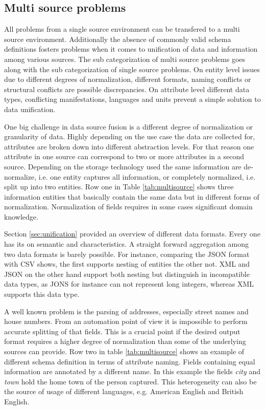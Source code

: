 \subsection{Multi source problems}
All problems from a single source environment can be transfered to a multi source environment. Additionally the absence of commonly valid schema definitions fosters problems when it comes to unification of data and information among various sources. The sub categorization of multi source problems goes along with the sub categorization of single source problems. On entity level issues due to different degrees of normalization, different formats, naming conflicts or structural conflicts are possible discrepancies. On attribute level different data types, conflicting manifestations, languages and units prevent a simple solution to data unification.

One big challenge in data source fusion is a different degree of normalization or granularity of data. Highly depending on the use case the data are collected for, attributes are broken down into different abstraction levels. For that reason one attribute in one source can correspond to two or more attributes in a second source. Depending on the storage technology used the same information are de-normalize, i.e. one entity captures all information, or completely normalized, i.e. split up into two entities. Row one in Table \ref{tab:multisource} shows three information entities that basically contain the same data but in different forms of normalization. Normalization of fields requires in some cases significant domain knowledge. 

Section \ref{sec:unification} provided an overview of different data formats. Every one has its on semantic and characteristics. A straight forward aggregation among two data formats is barely possible. For instance, comparing the JSON format with CSV shows, the first supports nesting of entities the other not. XML and JSON on the other hand support both nesting but distinguish in incompatible data types, as JONS for instance can not represent long integers, whereas XML supports this data type.

A well known problem is the parsing of addresses, especially street names and house numbers. From an automation point of view it is impossible to perform accurate splitting of that fields. This is a crucial point if the desired output format requires a higher degree of normalization than some of the underlying sources can provide. Row two in table \ref{tab:multisource} shows an example of different schema definition in terms of attribute naming. Fields containing equal information are annotated by a different name. In this example the fields \textit{city} and \textit{town} hold the home town of the person captured. This heterogeneity can also be the source of usage of different languages, e.g. American English and British English. 

